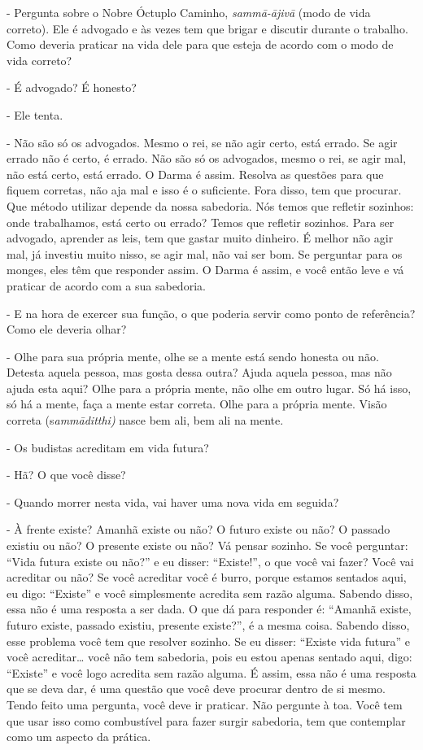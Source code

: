 {}- Pergunta sobre o Nobre Óctuplo Caminho,
\textit{samm\=a-\=ajiv\=a }(modo de vida correto). Ele é advogado e às
vezes tem que brigar e discutir durante o trabalho. Como deveria
praticar na vida dele para que esteja de acordo com o modo de vida
correto?

{}- É advogado? É honesto?

{}- Ele tenta.

{}- Não são só os advogados. Mesmo o rei, se não agir certo, está
errado. Se agir errado não é certo, é errado. Não são só os advogados,
mesmo o rei, se agir mal, não está certo, está errado. O Darma é assim.
Resolva as questões para que fiquem corretas, não aja mal e isso é o
suficiente. Fora disso, tem que procurar. Que método utilizar depende
da nossa sabedoria. Nós temos que refletir sozinhos: onde trabalhamos,
está certo ou errado? Temos que refletir sozinhos. Para ser advogado,
aprender as leis, tem que gastar muito dinheiro. É melhor não agir mal,
já investiu muito nisso, se agir mal, não vai ser bom. Se perguntar
para os monges, eles têm que responder assim. O Darma é assim, e você
então leve e vá praticar de acordo com a sua sabedoria.

{}- E na hora de exercer sua função, o que poderia servir como ponto
de referência? Como ele deveria olhar?

{}- Olhe para sua própria mente, olhe se a mente está sendo honesta
ou não. Detesta aquela pessoa, mas gosta dessa outra? Ajuda aquela
pessoa, mas não ajuda esta aqui? Olhe para a própria mente, não olhe em
outro lugar. Só há isso, só há a mente, faça a mente estar correta.
Olhe para a própria mente. Visão correta (s\textit{amm\=aditthi) }nasce
bem ali, bem ali na mente.

{}- Os budistas acreditam em vida futura?

{}- Hã? O que você disse? 

{}- Quando morrer nesta vida, vai haver uma nova vida em seguida?

{}- À frente existe? Amanhã existe ou não? O futuro existe ou não? O
passado existiu ou não? O presente existe ou não? Vá pensar sozinho. Se
você perguntar: “Vida futura existe ou não?” e eu disser: “Existe!”, o
que você vai fazer? Você vai acreditar ou não? Se você acreditar você é
burro, porque estamos sentados aqui, eu digo: “Existe” e você
simplesmente acredita sem razão alguma. Sabendo disso, essa não é uma
resposta a ser dada. O que dá para responder é: “Amanhã existe, futuro
existe, passado existiu, presente existe?”, é a mesma coisa. Sabendo
disso, esse problema você tem que resolver sozinho. Se eu disser:
“Existe vida futura” e você acreditar… você não tem sabedoria, pois eu
estou apenas sentado aqui, digo: “Existe” e você logo acredita sem
razão alguma. É assim, essa não é uma resposta que se deva dar, é uma
questão que você deve procurar dentro de si mesmo. Tendo feito uma
pergunta, você deve ir praticar. Não pergunte à toa. Você tem que usar
isso como combustível para fazer surgir sabedoria, tem que contemplar
como um aspecto da prática.

